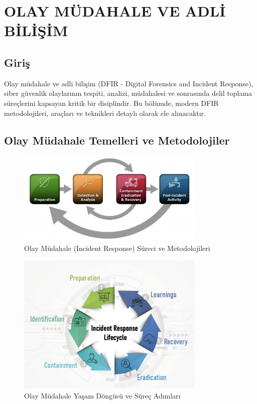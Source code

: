 ﻿\chapter{OLAY MÜDAHALE VE ADLİ BİLİŞİM}

\section*{Giriş}
Olay müdahale ve adli bilişim (DFIR - Digital Forensics and Incident Response), siber güvenlik olaylarının tespiti, analizi, müdahalesi ve sonrasında delil toplama süreçlerini kapsayan kritik bir disiplindir. Bu bölümde, modern DFIR metodolojileri, araçları ve teknikleri detaylı olarak ele alınacaktır.



\section{Olay Müdahale Temelleri ve Metodolojiler}

\begin{figure}[H]
    \centering
    \includegraphics[width=0.8\textwidth]{img/IR.png}
    \caption{Olay Müdahale (Incident Response) Süreci ve Metodolojileri}
    \label{fig:incident-response}
\end{figure}

\begin{figure}[H]
    \centering
    \includegraphics[width=0.8\textwidth]{img/IR_lifecycle.png}
    \caption{Olay Müdahale Yaşam Döngüsü ve Süreç Adımları}
    \label{fig:ir-lifecycle}
\end{figure}



